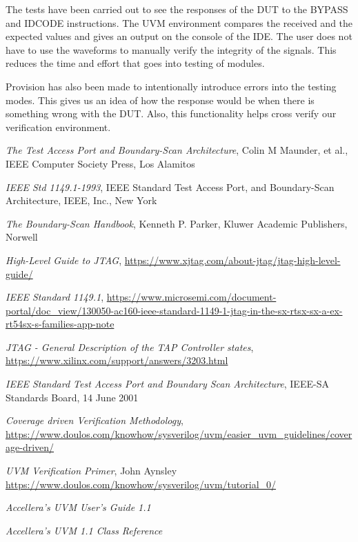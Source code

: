 \documentclass[a4paper,11pt]{article}
\begin{document}
The tests have been carried out to see the responses of the DUT to the BYPASS and IDCODE instructions. The UVM environment compares the received and the expected values and gives an output on the console of the IDE. The user does not have to use the waveforms to manually verify the integrity of the signals. This reduces the time and effort that goes into testing of modules.

Provision has also been made to intentionally introduce errors into the testing modes. This gives us an idea of how the response would be when there is something wrong with the DUT. Also, this functionality helps cross verify our verification environment.
%
\newpage

\begin{thebibliography}{i}
 {\em The Test Access Port and Boundary-Scan Architecture}, Colin M Maunder, et al., IEEE Computer Society Press, Los Alamitos

 {\em IEEE Std 1149.1-1993}, IEEE Standard Test Access Port, and Boundary-Scan Architecture, IEEE, Inc., New York

 {\em The Boundary-Scan Handbook}, Kenneth P. Parker, Kluwer Academic Publishers, Norwell

 {\em High-Level Guide to JTAG},
\url{https://www.xjtag.com/about-jtag/jtag-high-level-guide/}

 {\em IEEE Standard 1149.1},
\url{https://www.microsemi.com/document-portal/doc_view/130050-ac160-ieee-standard-1149-1-jtag-in-the-sx-rtsx-sx-a-ex-rt54sx-s-families-app-note}

 {\em JTAG - General Description of the TAP Controller states},
\url{https://www.xilinx.com/support/answers/3203.html}

 {\em IEEE Standard Test Access Port and Boundary Scan Architecture}, IEEE-SA Standards Board, 14 June 2001

 {\em Coverage driven Verification Methodology},
\url{https://www.doulos.com/knowhow/sysverilog/uvm/easier_uvm_guidelines/coverage-driven/}

 {\em UVM Verification Primer}, John Aynsley
\url{https://www.doulos.com/knowhow/sysverilog/uvm/tutorial_0/}

 {\em Accellera's UVM User's Guide 1.1}

 {\em Accellera's UVM 1.1 Class Reference}


\end{thebibliography}
\end{document}
